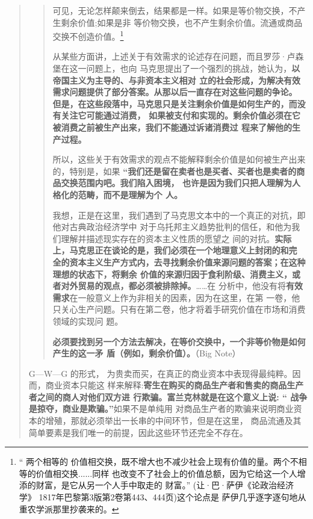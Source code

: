 \begin{quotation}
\begin{quotation}
可见，无论怎样颠来倒去，结果都是一样。如果是等价物交换，不产生剩余价值;如果是非
等价物交换，也不产生剩余价值。流通或商品交换不创造价值。\footnote{“ 两个相等的
价值相交换，既不增大也不减少社会上现有价值的量。两个不相等的价值相交换......同样
也改变不了社会上的价值总额，因为它给这一个人增添的财富，是它从另一个人手中取走的
财富。” (让·巴·萨伊《论政治经济学》 1817年巴黎第3版第2卷第443、444页)这个论点是
萨伊几乎逐字逐句地从重农学派那里抄袭来的。}

\bigskip

从某些方面讲，上述关于有效需求的论述存在问题，而且罗莎·卢森堡在这一问题上，也向
马克思提出了一个强烈的挑战，她认为，\textbf{以帝国主义为主导的、与非资本主义相对
立的社会形成，为解决有效需求问题提供了部分答案。从那以后一直存在对这些问题的争论。
但是，在这些段落中，马克思只是关注剩余价值是如何生产的，而没有关注它可能通过消费，
如果被支付和实现的。剩余价值必须在它被消费之前被生产出来，我们不能通过诉诸消费过
程来了解他的生产过程。}

所以，这些关于有效需求的观点不能解释剩余价值是如何被生产出来的，特别是，如果
\textbf{“我们还是留在卖者也是买者、买者也是卖者的商品交换范围内吧。我们陷入困境，
也许是因为我们只把人理解为人格化的范畴，而不是理解为个
人。}

我想，正是在这里，我们遇到了马克思文本中的一个真正的对抗，即他对古典政治经济学中
对于乌托邦主义趋势批判的信任，和他为我们理解并描述现实存在的资本主义性质的愿望之
间的对抗。\textbf{实际上，马克思正在谈论的是，我们必须在一个地理意义上封闭的和完
全的资本主义生产方式内，去寻找剩余价值来源问题的答案；在这种理想的状态下，将剩余
价值的来源归因于食利阶级、消费主义，或者对外贸易的观点，都必须被排除掉。}……在
分析中，他没有将\textbf{有效需求}在一般意义上作为非相关的因素，因为在这里，在第
一卷，他只关心生产问题。只有在第二卷，他才将着手研究价值在市场和消费领域的实现问
题。

\textbf{必须要找到另一个方法去解决，在等价交换中，一个非等价物是如何产生的这一矛
盾（例如，剩余价值）。}（Big Note）

\end{quotation}

G—W—G 的形式， 为贵卖而买，在真正的商业资本中表现得最纯粹。因而，商业资本只能这
样来解释:\textbf{寄生在购买的商品生产者和售卖的商品生产者之间的商人对他们双方进
行欺骗。富兰克林就是在这个意义上说: “ 战争是掠夺，商业是欺骗。”}如果不是单纯用
对商品生产者的欺骗来说明商业资本的增殖，那就必须举出一长串的中间环节，但是在这里，
商品流通及其简单要素是我们唯一的前提，因此这些环节还完全不存在。


\end{quotation}
